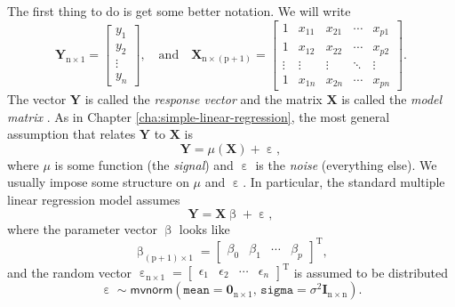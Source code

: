\documentclass[captions=tableheading]{scrbook}
\begin{document}
The first thing to do is get some better notation. We will write 
\begin{equation}
\mathbf{Y}_{\mathrm{n}\times1}=
\begin{bmatrix}y_{1}\\
y_{2}\\
\vdots\\
y_{n}
\end{bmatrix},
\quad\mbox{and}\quad\mathbf{X}_{\mathrm{n}\times(\mathrm{p}+1)}=
\begin{bmatrix}1 & x_{11} & x_{21} & \cdots & x_{p1}\\
1 & x_{12} & x_{22} & \cdots & x_{p2}\\
\vdots & \vdots & \vdots & \ddots & \vdots\\
1 & x_{1n} & x_{2n} & \cdots & x_{pn}
\end{bmatrix}.
\end{equation}
The vector \(\mathbf{Y}\) is called the \emph{response vector}  and the matrix \(\mathbf{X}\) is called the \emph{model matrix} . As in Chapter \ref{cha:simple-linear-regression}, the most general assumption that relates \(\mathbf{Y}\) to \(\mathbf{X}\) is
\begin{equation}
\mathbf{Y}=\mu(\mathbf{X})+\upepsilon,
\end{equation}
where \(\mu\) is some function (the \emph{signal}) and \(\upepsilon\) is the \emph{noise} (everything else). We usually impose some structure on \(\mu\) and \(\upepsilon\). In particular, the standard multiple linear regression model assumes
\begin{equation}
\mathbf{Y}=\mathbf{X}\upbeta+\upepsilon,
\end{equation}
where the parameter vector \(\upbeta\) looks like 
\begin{equation}
\upbeta_{(\mathrm{p}+1)\times1}=\begin{bmatrix}\beta_{0} & \beta_{1} & \cdots & \beta_{p}\end{bmatrix}^{\mathrm{T}},
\end{equation}
and the random vector \(\upepsilon_{\mathrm{n}\times1}=\begin{bmatrix}\epsilon_{1} & \epsilon_{2} & \cdots & \epsilon_{n}\end{bmatrix}^{\mathrm{T}}\) is assumed to be distributed
\begin{equation}
\upepsilon\sim\mathsf{mvnorm}\left(\mathtt{mean}=\mathbf{0}_{\mathrm{n}\times1},\,\mathtt{sigma}=\sigma^{2}\mathbf{I}_{\mathrm{n}\times\mathrm{n}}\right).
\end{equation}
\end{document}
